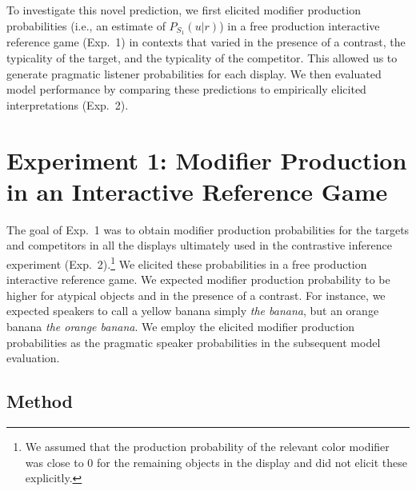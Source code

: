 \documentclass[10pt,letterpaper]{article}
\newcommand{\jd}[1]{\textcolor{Purple}{[jd: #1]}}
\begin{document}

To investigate this novel prediction, we first elicited modifier production probabilities (i.e., an estimate of $P_{S_1}(u|r)$) in a free production interactive reference game (Exp.~1) in contexts that varied in the presence of a contrast, the typicality of the target, and the typicality of the competitor. This allowed us to generate pragmatic listener probabilities for each display. We then evaluated model performance by comparing these predictions to empirically elicited interpretations (Exp.~2).


\section{Experiment 1: Modifier Production in an Interactive Reference Game}

The goal of Exp.~1 was to obtain modifier production probabilities for the targets and competitors in all the displays ultimately used in the contrastive inference experiment (Exp.~2).\footnote{We assumed that the production probability of the relevant color modifier was close to 0 for the remaining objects in the display and did not elicit these explicitly.} We elicited these probabilities in a free production interactive reference game. We expected modifier production probability to be higher for atypical objects and in the presence of a contrast. For instance, we expected speakers to call a yellow banana simply \textit{the banana}, but an orange banana \textit{the orange banana}. We employ the elicited modifier production probabilities as the pragmatic speaker probabilities in the subsequent model evaluation.

\subsection{Method}

\end{document}
